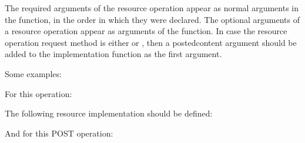 \documentclass[letterpaper,10pt,english]{sphinxmanual}
\begin{document}
The required arguments of the resource operation appear as normal arguments in the function, in the order in which they were declared. The optional arguments of a resource operation appear as  arguments of the function. In case the resource operation request method is either  or , then a {\color{red}\bfseries{}\textasciigrave{}\textasciigrave{}}posted\sphinxhyphen{}content\textasciigrave{} argument should be added to the implementation function as the first argument.

Some examples:

For this operation:

\begin{sphinxVerbatim}[commandchars=\\\{\}]
  
                      
                      
                      
                      
                        
\end{sphinxVerbatim}

The following resource implementation should be defined:

\begin{sphinxVerbatim}[commandchars=\\\{\}]
    
       
\end{sphinxVerbatim}

And for this POST operation:

\begin{sphinxVerbatim}[commandchars=\\\{\}]
  
                              
                              
                              
                              
\end{sphinxVerbatim}
\end{document}
